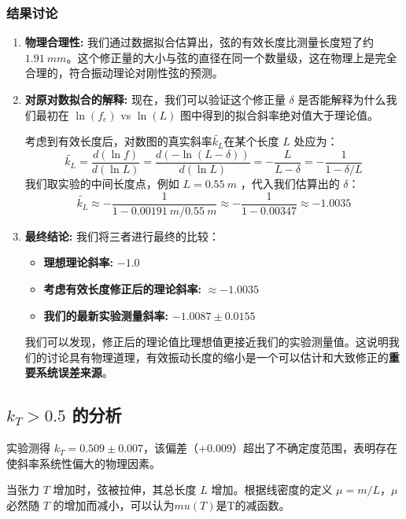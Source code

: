 \documentclass[10pt,twocolumn]{article}
\begin{document}
\subsubsection{结果讨论}
\begin{enumerate}
    \item \textbf{物理合理性:} 我们通过数据拟合估算出，弦的有效长度比测量长度短了约 $\SI{1.91}{mm}$。这个修正量的大小与弦的直径在同一个数量级，这在物理上是完全合理的，符合振动理论对刚性弦的预测。

    \item \textbf{对原对数拟合的解释:} 现在，我们可以验证这个修正量 $\delta$ 是否能解释为什么我们最初在 $\ln(f_e)$ vs $\ln(L)$ 图中得到的拟合斜率绝对值大于理论值。
    
    考虑到有效长度后，对数图的真实斜率$\tilde{k_L}$在某个长度 $L$ 处应为：
    $$ \tilde{k_L} = \frac{d(\ln f)}{d(\ln L)} = \frac{d(-\ln(L-\delta))}{d(\ln L)} = -\frac{L}{L-\delta} = -\frac{1}{1 - \delta/L} $$
    我们取实验的中间长度点，例如 $L = \SI{0.55}{m}$ ，代入我们估算出的 $\delta$：
    $$ \tilde{k_L} \approx -\frac{1}{1 - \SI{0.00191}{m}/\SI{0.55}{m}} \approx -\frac{1}{1 - 0.00347} \approx -1.0035 $$
    
    \item \textbf{最终结论:} 我们将三者进行最终的比较：
        \begin{itemize}
            \item \textbf{理想理论斜率:} $-1.0$
            \item \textbf{考虑有效长度修正后的理论斜率:} $\approx -1.0035$
            \item \textbf{我们的最新实验测量斜率:} $-1.0087 \pm 0.0155$
        \end{itemize}
    我们可以发现，修正后的理论值比理想值更接近我们的实验测量值。这说明我们的讨论具有物理道理，有效振动长度的缩小是一个可以估计和大致修正的\textbf{重要系统误差来源}。
\end{enumerate}

\subsection{$k_T > 0.5$ 的分析}

实验测得 $k_T = 0.509 \pm 0.007$，该偏差（$+0.009$）超出了不确定度范围，表明存在使斜率系统性偏大的物理因素。

\par

当张力 $T$ 增加时，弦被拉伸，其总长度 $L$ 增加。根据线密度的定义 $\mu = m / L$，$\mu$ 必然随 $T$ 的增加而减小，可以认为$mu(T)$是T的减函数。
\end{document}
